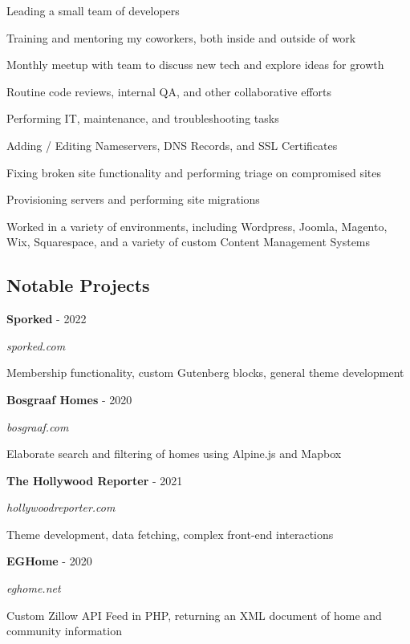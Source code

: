 \documentclass{article}
\newenvironment{narrow_list}{
	\begin{itemize}
		\setlength{\itemsep}{0pt}
		\setlength{\parskip}{-1pt}
		\setlength{\parsep}{0pt}
	}{\end{itemize}
}
\begin{document}
	Leading a small team of developers

	\begin{narrow_list}
		\item Training and mentoring my coworkers, both inside and outside of work
		\item Monthly meetup with team to discuss new tech and explore ideas for growth
		\item Routine code reviews, internal QA, and other collaborative efforts
	\end{narrow_list}

	Performing IT, maintenance, and troubleshooting tasks

	\begin{narrow_list}
		\item Adding / Editing Nameservers, DNS Records, and SSL Certificates
		\item Fixing broken site functionality and performing triage on compromised sites
		\item Provisioning servers and performing site migrations
		\item Worked in a variety of environments, including Wordpress, Joomla, Magento, Wix, Squarespace, and a variety of custom Content Management Systems
	\end{narrow_list}

	

	\vspace{3mm}

	\subsection*{Notable Projects}

	\vspace{0mm}

	\setlength{\columnsep}{1cm}

	\begin{multicols}{2}
		\textbf{Sporked} - 2022

		\textit{sporked.com}

		Membership functionality, custom Gutenberg blocks, general theme development

	\vspace{2mm}

		\textbf{Bosgraaf Homes} - 2020

		\textit{bosgraaf.com}
			
		Elaborate search and filtering of homes using Alpine.js and Mapbox

	\columnbreak

		\textbf{The Hollywood Reporter} - 2021

		\textit{hollywoodreporter.com}

		Theme development, data fetching, complex front-end interactions

	\vspace{2mm}

		\textbf{EGHome} - 2020

		\textit{eghome.net}

		Custom Zillow API Feed in PHP, returning an XML document of home and community information

	\end{multicols}
\end{document}
